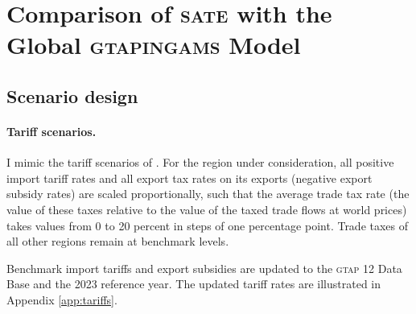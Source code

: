 \documentclass{jgea}
\newcommand{\SATE}{\textsc{sate}\xspace}
\newcommand{\GTAP}{\textsc{gtap}\xspace}
\newcommand{\GTAPINGAMS}{\textsc{gtapingams}\xspace}
\begin{document}
\section{Comparison of \SATE with the Global \GTAPINGAMS Model}\label{sec:comparison}

\subsection{Scenario design}\label{sec:design}

\paragraph{\bf Tariff scenarios.}
I mimic the tariff scenarios of \citet{LanzRutherford2016}.
For the region under consideration, all positive import tariff rates and all export tax rates on its exports (negative export subsidy rates) are scaled proportionally, such that the average trade tax rate (the value of these taxes relative to the value of the taxed trade flows at world prices) takes values from 0 to 20 percent in steps of one percentage point.
Trade taxes of all other regions remain at benchmark levels.

Benchmark import tariffs and export subsidies are updated to the \GTAP 12 Data Base and the 2023 reference year.
The updated tariff rates are illustrated in Appendix \ref{app:tariffs}.
\end{document}
